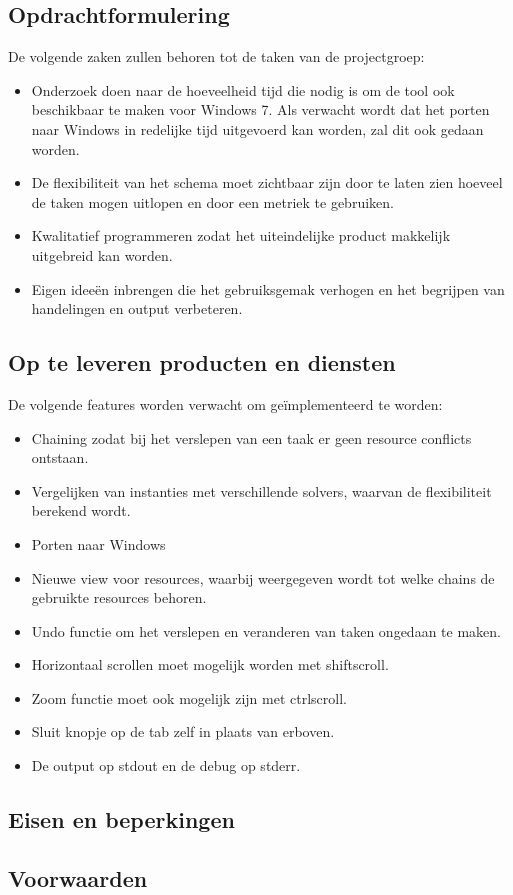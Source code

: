 \subsection{Opdrachtformulering}
De volgende zaken zullen behoren tot de taken van de projectgroep:
\begin{itemize}
	\item Onderzoek doen naar de hoeveelheid tijd die nodig is om de tool ook beschikbaar te maken voor Windows 7. Als verwacht wordt dat het porten naar Windows in redelijke tijd uitgevoerd kan worden, zal dit ook gedaan worden. 
	\item De flexibiliteit van het schema moet zichtbaar zijn door te laten zien hoeveel de taken mogen uitlopen en door een metriek te gebruiken.
	\item Kwalitatief programmeren zodat het uiteindelijke product makkelijk uitgebreid kan worden.
	\item Eigen idee\"en inbrengen die het gebruiksgemak verhogen en het begrijpen van handelingen en output verbeteren.
\end{itemize}

\subsection{Op te leveren producten en diensten}
De volgende features worden verwacht om ge\"implementeerd te worden:
\begin{itemize}
	\item Chaining zodat bij het verslepen van een taak er geen resource conflicts ontstaan.
	\item Vergelijken van instanties met verschillende solvers, waarvan de flexibiliteit berekend wordt.
	\item Porten naar Windows
	\item Nieuwe view voor resources, waarbij weergegeven wordt tot welke chains de gebruikte resources behoren.
	\item Undo functie om het verslepen en veranderen van taken ongedaan te maken.
	\item Horizontaal scrollen moet mogelijk worden met shift\plus scroll.
	\item Zoom functie moet ook mogelijk zijn met ctrl\plus scroll.
	\item Sluit knopje op de tab zelf in plaats van erboven.
	\item De output op stdout en de debug op stderr.
\end{itemize}

\subsection{Eisen en beperkingen}
\subsection{Voorwaarden}

